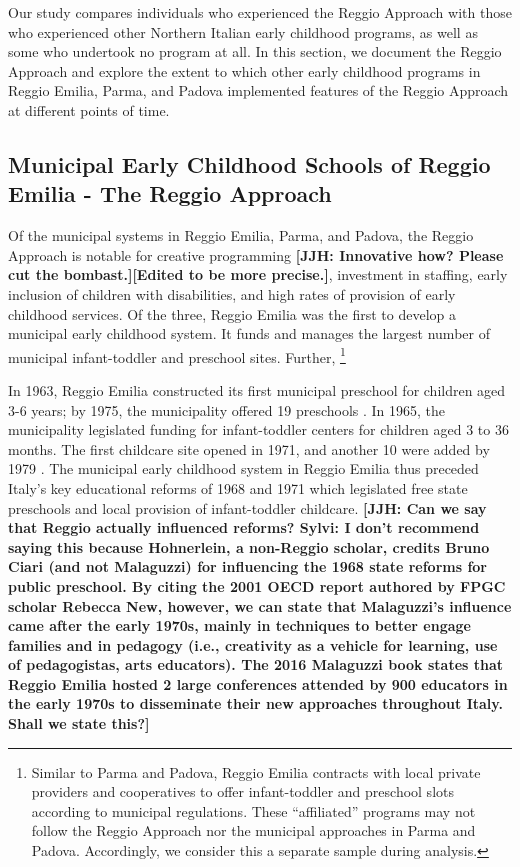 Our study compares individuals who experienced the Reggio Approach with those who experienced other Northern Italian early childhood programs, as well as some who undertook no program at all. In this section, we document the Reggio Approach and explore the extent to which other early childhood programs in Reggio Emilia, Parma, and Padova implemented features of the Reggio Approach at different points of time.

\subsection{Municipal Early Childhood Schools of Reggio Emilia - The Reggio Approach}

Of the municipal systems in Reggio Emilia, Parma, and Padova, the Reggio Approach is notable for creative programming \textbf{[JJH: Innovative how? Please cut the bombast.][Edited to be more precise.]}, investment in staffing, early inclusion of children with disabilities, and high rates of provision of early childhood services. Of the three, Reggio Emilia was the first to develop a municipal early childhood system. It funds and manages the largest number of municipal infant-toddler and preschool sites. Further, \footnote{Similar to Parma and Padova, Reggio Emilia contracts with local private providers and cooperatives to offer infant-toddler and preschool slots according to municipal regulations. These ``affiliated'' programs may not follow the Reggio Approach nor the municipal approaches in Parma and Padova. Accordingly, we consider this a separate sample during analysis.} 

In 1963, Reggio Emilia constructed its first municipal preschool for children aged 3-6 years; by 1975, the municipality offered 19 preschools \citep{Hohnerlein_2009_Paradox-Public-Preschools}. In 1965, the municipality legislated funding for infant-toddler centers for children aged 3 to 36 months. The first childcare site opened in 1971, and another 10 were added by 1979 \citep{Cagliari-etal-eds_2016_BOOK_Loris-Malaguzzi}. The municipal early childhood system in Reggio Emilia thus preceded Italy's key educational reforms of 1968 and 1971 which legislated free state preschools and local provision of infant-toddler childcare. \textbf{[JJH: Can we say that Reggio actually influenced reforms? Sylvi: I don't recommend saying this because Hohnerlein, a non-Reggio scholar, credits Bruno Ciari (and not Malaguzzi) for influencing the 1968 state reforms for public preschool. By citing the 2001 OECD report authored by FPGC scholar Rebecca New, however, we can state that Malaguzzi's influence came after the early 1970s, mainly in techniques to better engage families and in pedagogy (i.e., creativity as a vehicle for learning, use of pedagogistas, arts educators). The 2016 Malaguzzi book states that Reggio Emilia hosted 2 large conferences attended by 900 educators in the early 1970s to disseminate their new approaches throughout Italy. Shall we state this?]}

